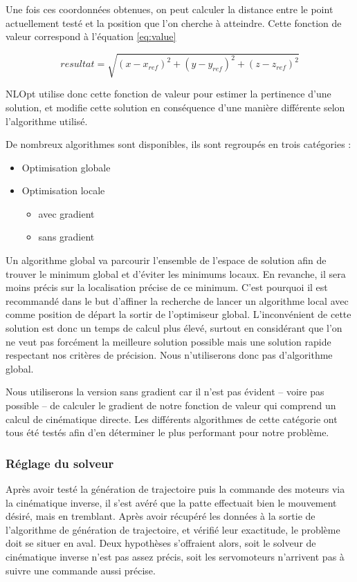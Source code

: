 \documentclass{tnreport}
\begin{document}
Une fois ces coordonnées obtenues, on peut calculer la distance entre le point actuellement testé et la position que l'on cherche à atteindre. Cette fonction de valeur correspond à l'équation \ref{eq:value}

\begin{equation}\label{eq:value}
resultat = \sqrt{(x-x_{ref})^2+(y-y_{ref})^2+(z-z_{ref})^2}
\end{equation}

NLOpt utilise donc cette fonction de valeur pour estimer la pertinence d'une solution, et modifie cette solution en conséquence d'une manière différente selon l'algorithme utilisé. 

De nombreux algorithmes sont disponibles, ils sont regroupés en trois catégories :
\begin{itemize}
    \item Optimisation globale
    \item Optimisation locale\begin{itemize}
        \item avec gradient
        \item sans gradient
    \end{itemize}
\end{itemize}

Un algorithme global va parcourir l'ensemble de l'espace de solution afin de trouver le minimum global et d'éviter les minimums locaux. En revanche, il sera moins précis sur la localisation précise de ce minimum. C'est pourquoi il est recommandé dans le but d'affiner la recherche de lancer un algorithme local avec comme position de départ la sortir de l'optimiseur global. L'inconvénient de cette solution est donc un temps de calcul plus élevé, surtout en considérant que l'on ne veut pas forcément la meilleure solution possible mais une solution rapide respectant nos critères de précision. Nous n'utiliserons donc pas d'algorithme global.

Nous utiliserons la version sans gradient car il n'est pas évident -- voire pas possible -- de calculer le gradient de notre fonction de valeur qui comprend un calcul de cinématique directe. Les différents algorithmes de cette catégorie ont tous été testés afin d'en déterminer le plus performant pour notre problème. 

\subsubsection{Réglage du solveur}
Après avoir testé la génération de trajectoire puis la commande des moteurs via la cinématique inverse, il s'est avéré que la patte effectuait bien le mouvement désiré, mais en tremblant. Après avoir récupéré les données à la sortie de l'algorithme de génération de trajectoire, et vérifié leur exactitude, le problème doit se situer en aval. Deux hypothèses s'offraient alors, soit le solveur de cinématique inverse n'est pas assez précis, soit les servomoteurs n'arrivent pas à suivre une commande aussi précise. 
\end{document}
